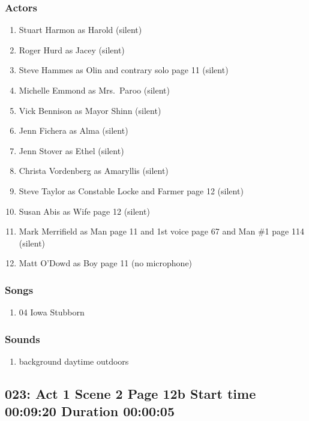 \subsubsection{Actors}
\begin{enumerate}
\item Stuart Harmon as Harold (silent)
\item Roger Hurd as Jacey (silent)
\item Steve Hammes as Olin and contrary solo page 11 (silent)
\item Michelle Emmond as Mrs.~Paroo (silent)
\item Vick Bennison as Mayor Shinn (silent)
\item Jenn Fichera as Alma (silent)
\item Jenn Stover as Ethel (silent)
\item Christa Vordenberg as Amaryllis (silent)
\item Steve Taylor as Constable Locke and Farmer page 12 (silent)
\item Susan Abis as Wife page 12 (silent)
\item Mark Merrifield as Man page 11 and 1st voice page 67 and Man \#1 page 114 (silent)
\item Matt O'Dowd as Boy page 11 (no microphone)
\end{enumerate}

\subsubsection{Songs}
\begin{enumerate}
\item 04 Iowa Stubborn
\end{enumerate}\subsubsection{Sounds}
\begin{enumerate}
\item background daytime outdoors
\end{enumerate}
\subsection{023: Act 1 Scene 2 Page 12b Start time 00:09:20 Duration 00:00:05}


